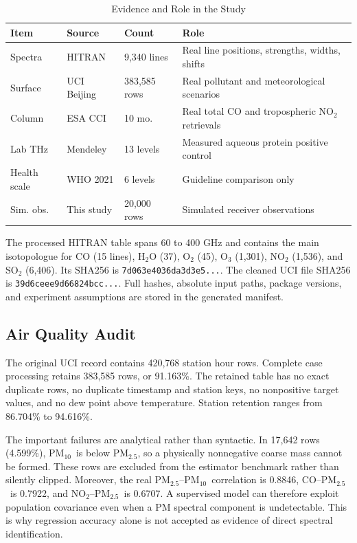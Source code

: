 \documentclass[conference]{IEEEtran}
\newcommand{\pmfive}{PM$_{2.5}$}
\newcommand{\pmten}{PM$_{10}$}
\begin{document}
\begin{table}[t]
\caption{Evidence and Role in the Study}
\label{tab:evidence}
\centering
\scriptsize
\setlength{\tabcolsep}{2.0pt}
\begin{tabular}{@{}p{0.95cm}p{1.35cm}p{0.90cm}p{3.05cm}@{}}
\toprule
Item & Source & Count & Role \\
\midrule
Spectra & HITRAN & 9,340 lines & Real line positions, strengths, widths, shifts \\
Surface & UCI Beijing & 383,585 rows & Real pollutant and meteorological scenarios \\
Column & ESA CCI & 10 mo. & Real total CO and tropospheric NO$_2$ retrievals \\
Lab THz & Mendeley & 13 levels & Measured aqueous protein positive control \\
Health scale & WHO 2021 & 6 levels & Guideline comparison only \\
Sim. obs. & This study & 20,000 rows & Simulated receiver observations \\
\bottomrule
\end{tabular}
\end{table}

The processed HITRAN table spans 60 to 400 GHz and contains the main isotopologue for CO (15 lines), H$_2$O (37), O$_2$ (45), O$_3$ (1,301), NO$_2$ (1,536), and SO$_2$ (6,406). Its SHA256 is \texttt{7d063e4036da3d3e5...}. The cleaned UCI file SHA256 is \texttt{39d6ceee9d66824bcc...}. Full hashes, absolute input paths, package versions, and experiment assumptions are stored in the generated manifest.

\subsection{Air Quality Audit}

The original UCI record contains 420,768 station hour rows. Complete case processing retains 383,585 rows, or 91.163\%. The retained table has no exact duplicate rows, no duplicate timestamp and station keys, no nonpositive target values, and no dew point above temperature. Station retention ranges from 86.704\% to 94.616\%.

The important failures are analytical rather than syntactic. In 17,642 rows (4.599\%), \pmten\ is below \pmfive, so a physically nonnegative coarse mass cannot be formed. These rows are excluded from the estimator benchmark rather than silently clipped. Moreover, the real \pmfive--\pmten\ correlation is 0.8846, CO--\pmfive\ is 0.7922, and NO$_2$--\pmfive\ is 0.6707. A supervised model can therefore exploit population covariance even when a PM spectral component is undetectable. This is why regression accuracy alone is not accepted as evidence of direct spectral identification.
\end{document}
